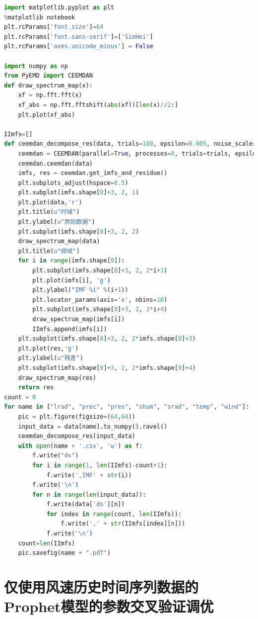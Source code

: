 \documentclass[AutoFakeBold]{LZUThesis}
\begin{document}
\begin{lstlisting}[language = python]
import matplotlib.pyplot as plt
%matplotlib notebook
plt.rcParams['font.size']=64
plt.rcParams['font.sans-serif']=['SimHei']
plt.rcParams['axes.unicode_minus'] = False

import numpy as np
from PyEMD import CEEMDAN
def draw_spectrum_map(x):
    xf = np.fft.fft(x)
    xf_abs = np.fft.fftshift(abs(xf))[len(x)//2:]
    plt.plot(xf_abs)

IImfs=[]
def ceemdan_decompose_res(data, trials=100, epsilon=0.005, noise_scale=1, noise_kind="normal", range_thr=0.01, total_power_thr=0.05):
    ceemdan = CEEMDAN(parallel=True, processes=8, trials=trials, epsilon=epsilon, noise_scale=noise_scale, noise_kind=noise_kind, range_thr=range_thr, total_power_thr=total_power_thr)
    ceemdan.ceemdan(data)
    imfs, res = ceemdan.get_imfs_and_residue()
    plt.subplots_adjust(hspace=0.5)
    plt.subplot(imfs.shape[0]+3, 2, 1)
    plt.plot(data,'r')
    plt.title(u"时域")
    plt.ylabel(u"原始数据")
    plt.subplot(imfs.shape[0]+3, 2, 2)
    draw_spectrum_map(data)
    plt.title(u"频域")
    for i in range(imfs.shape[0]):
        plt.subplot(imfs.shape[0]+3, 2, 2*i+3)
        plt.plot(imfs[i], 'g')
        plt.ylabel("IMF %i" %(i+1))
        plt.locator_params(axis='x', nbins=10)
        plt.subplot(imfs.shape[0]+3, 2, 2*i+4)
        draw_spectrum_map(imfs[i])
        IImfs.append(imfs[i])
    plt.subplot(imfs.shape[0]+3, 2, 2*imfs.shape[0]+3)
    plt.plot(res,'g')
    plt.ylabel(u"残差")
    plt.subplot(imfs.shape[0]+3, 2, 2*imfs.shape[0]+4)
    draw_spectrum_map(res)
    return res
count = 0
for name in ["lrad", "prec", "pres", "shum", "srad", "temp", "wind"]:
    pic = plt.figure(figsize=(64,64))
    input_data = data[name].to_numpy().ravel()
    ceemdan_decompose_res(input_data)
    with open(name + '.csv', 'w') as f:
        f.write("ds")
        for i in range(1, len(IImfs)-count+1):
            f.write(',IMF' + str(i))
        f.write('\n')
        for n in range(len(input_data)):
            f.write(data['ds'][n])
            for index in range(count, len(IImfs)):
                f.write(',' + str(IImfs[index][n]))
            f.write('\n')
    count=len(IImfs)
    pic.savefig(name + ".pdf")
\end{lstlisting}

\section{仅使用风速历史时间序列数据的Prophet模型的参数交叉验证调优}
\end{document}
